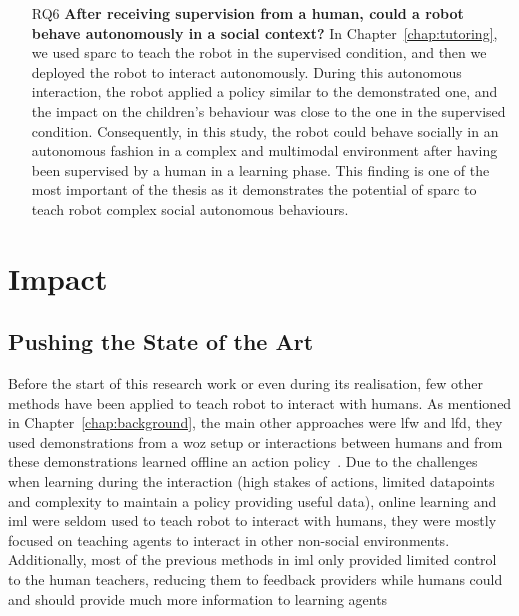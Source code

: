 \begin{itemize}
\item [RQ6] \textbf{After receiving supervision from a human, could a robot behave autonomously in a social context?}
In Chapter~\ref{chap:tutoring}, we used \gls{sparc} to teach the robot in the supervised condition, and then we deployed the robot to interact autonomously. During this autonomous interaction, the robot applied a policy similar to the demonstrated one, and the impact on the children's behaviour was close to the one in the supervised condition. Consequently, in this study, the robot could behave socially in an autonomous fashion in a complex and multimodal environment after having been supervised by a human in a learning phase. This finding is one of the most important of the thesis as it demonstrates the potential of \gls{sparc} to teach robot complex social autonomous behaviours.

\end{itemize}
\section{Impact} \label{sec:disc_impact}

\subsection{Pushing the State of the Art}

Before the start of this research work or even during its realisation, few other methods have been applied to teach robot to interact with humans. As mentioned in Chapter~\ref{chap:background}, the main other approaches were \gls{lfw} and \gls{lfd}, they used demonstrations from a \gls{woz} setup or interactions between humans and from these demonstrations learned offline an action policy~\citep{knox2014learning,liu2014train,sequeira2016discovering}. Due to the challenges when learning during the interaction (high stakes of actions, limited datapoints and complexity to maintain a policy providing useful data), online learning and \gls{iml} were seldom used to teach robot to interact with humans, they were mostly focused on teaching agents to interact in other non-social environments. Additionally, most of the previous methods in \gls{iml} only provided limited control to the human teachers, reducing them to feedback providers while humans could and should provide much more information to learning agents~\citep{amershi2014power}
	
